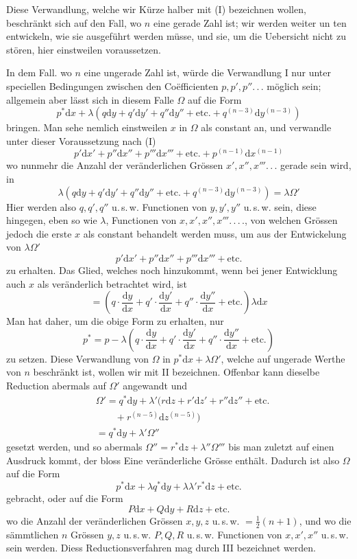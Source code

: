 Diese Verwandlung, welche wir Kürze halber mit (I) bezeichnen wollen, beschränkt sich auf den Fall, wo $n$ eine gerade Zahl ist; wir werden weiter un%
ten entwickeln, wie sie ausgeführt werden müsse, und sie, um die Uebersicht
nicht zu stören, hier einstweilen voraussetzen.
\par
In dem Fall. wo $n$ eine ungerade Zahl ist, würde die Verwandlung I nur
unter speciellen Bedingungen zwischen den Coëfficienten $p,p',p''.\,.\,.$ möglich
sein; allgemein aber lässt sich in diesem Falle $\Omega$ auf die Form
\[
p^{*}\mathrm{d}x+\lambda(q\mathrm{d}y+q'\mathrm{d}y'+q''\mathrm{d}y''+\mathrm{etc.}
+q^{(n-3)}\mathrm{d}y^{(n-3)})
\]
bringen. Man sehe nemlich einstweilen $x$ in $\Omega$ als constant an, und verwandle
unter dieser Voraussetzung nach (I)
\[
p'\mathrm{d}x'+p''\mathrm{d}x''+p'''\mathrm{d}x'''+\mathrm{etc.}
+p^{(n-1)}\mathrm{d}x^{(n-1)}
\]
wo nunmehr die Anzahl der veränderlichen Grössen $x',x'',x'''.\,.\,.$ gerade sein
wird, in
\[
\lambda(q\mathrm{d}y+q'\mathrm{d}y'+q''\mathrm{d}y''+\mathrm{etc.}
+q^{(n-3)}\mathrm{d}y^{(n-3)})=\lambda\Omega'
\]
Hier werden also $q,q',q''$ u.\,s.\,w. Functionen von $y,y',y''$ u.\,s.\,w. sein, diese hingegen, eben so wie $\lambda$, Functionen von $x,x',x'',x'''.\,.\,.\,.$, von welchen Grössen
jedoch die erste $x$ als constant behandelt werden muss, um aus der Entwickelung von $\lambda\Omega'$
\[
p'\mathrm{d}x'+p''\mathrm{d}x''+p'''\mathrm{d}x'''+\mathrm{etc.}
\]
zu erhalten. Das Glied, welches noch hinzukommt, wenn bei jener Entwicklung
auch $x$ als veränderlich betrachtet wird, ist
\[
=(q\cdot\frac{\mathrm{d}y}{\mathrm{d}x}
+q'\cdot\frac{\mathrm{d}y'}{\mathrm{d}x}
+q''\cdot\frac{\mathrm{d}y''}{\mathrm{d}x}+\mathrm{etc.})\lambda\mathrm{d}x
\]
Man hat daher, um die obige Form zu erhalten, nur
\[
p^{*}=p-\lambda(q\cdot\frac{\mathrm{d}y}{\mathrm{d}x}
+q'\cdot\frac{\mathrm{d}y'}{\mathrm{d}x}
+q''\cdot\frac{\mathrm{d}y''}{\mathrm{d}x}+\mathrm{etc.})
\]
zu setzen. Diese Verwandlung von $\Omega$ in $p^{*}\mathrm{d}x+\lambda\Omega'$, welche auf ungerade Werthe von $n$ beschränkt ist, wollen wir mit II bezeichnen. Offenbar kann dieselbe
Reduction abermals auf $\Omega'$ angewandt und
\[
\begin{aligned}
&\Omega'=q^{*}\mathrm{d}y+\lambda'(r\mathrm{d}z+r'\mathrm{d}z'+r''\mathrm{d}z''+\mathrm{etc.}\\&\qquad+r^{(n-5)}\mathrm{d}z^{(n-5)})\\
&=q^{*}\mathrm{d}y+\lambda'\Omega''
\end{aligned}
\]
gesetzt werden, und so abermals $\Omega''=r^{*}\mathrm{d}z+\lambda''\Omega'''$ bis man zuletzt auf einen
Ausdruck kommt, der bloss Eine veränderliche Grösse enthält. Dadurch ist also
$\Omega$ auf die Form
\[
p^{*}\mathrm{d}x+\lambda q^{*}\mathrm{d}y+\lambda\lambda'r^{*}\mathrm{d}z+\mathrm{etc.}
\]
gebracht, oder auf die Form
\[
P\mathrm{d}x+Q\mathrm{d}y+R\mathrm{d}z+\mathrm{etc.}
\]
wo die Anzahl der veränderlichen Grössen $x,y,z$ u.\,s.\,w. $=\frac12(n+1)$, und wo die
sämmtlichen $n$ Grössen $y,z$ u.\,s.\,w. $P,Q,R$ u.\,s.\,w. Functionen von $x,x',x''$ u.\,s.\,w.
sein werden. Diess Reductionsverfahren mag durch III bezeichnet werden.

